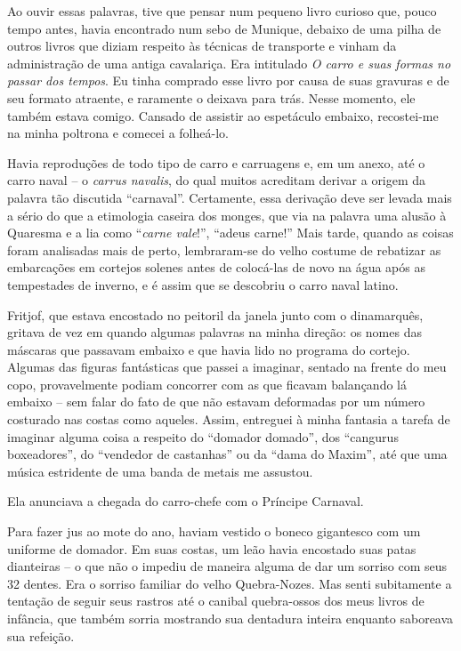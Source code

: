 Ao ouvir essas palavras, tive que pensar num pequeno livro curioso que,
pouco tempo antes, havia encontrado num sebo de Munique, debaixo de uma
pilha de outros livros que diziam respeito às técnicas de transporte e
vinham da administração de uma antiga cavalariça. Era intitulado \emph{O
carro e suas formas no passar dos tempos}. Eu tinha comprado esse livro
por causa de suas gravuras e de seu formato atraente, e raramente o
deixava para trás. Nesse momento, ele também estava comigo. Cansado de
assistir ao espetáculo embaixo, recostei-me na minha poltrona e comecei
a folheá-lo.

Havia reproduções de todo tipo de carro e carruagens e, em um anexo, até
o carro naval -- o \emph{carrus navalis}, do qual muitos acreditam
derivar a origem da palavra tão discutida ``carnaval''. Certamente, essa
derivação deve ser levada mais a sério do que a etimologia caseira dos
monges, que via na palavra uma alusão à Quaresma e a lia como
``\emph{carne vale}!'', ``adeus carne!'' Mais tarde, quando as coisas foram analisadas
mais de perto, lembraram-se do velho costume de rebatizar as
embarcações em cortejos solenes antes de colocá-las de novo na água após
as tempestades de inverno, e é assim que se descobriu o carro naval
latino.

Fritjof, que estava encostado no peitoril da janela junto com o
dinamarquês, gritava de vez em quando algumas palavras na minha direção:
os nomes das máscaras que passavam embaixo e que havia lido no programa
do cortejo. Algumas das figuras fantásticas que passei a imaginar,
sentado na frente do meu copo, provavelmente podiam concorrer com as que
ficavam balançando lá embaixo -- sem falar do fato de que não estavam
deformadas por um número costurado nas costas como aqueles. Assim,
entreguei à minha fantasia a tarefa de imaginar alguma coisa a respeito
do ``domador domado'', dos ``cangurus boxeadores'', do ``vendedor de
castanhas'' ou da ``dama do Maxim'', até que uma música estridente
de uma banda de metais me assustou.

Ela anunciava a chegada do carro-chefe com o Príncipe Carnaval.%

Para fazer jus ao mote do ano, haviam vestido o boneco gigantesco com um
uniforme de domador. Em suas costas, um leão havia encostado suas patas
dianteiras -- o que não o impediu de maneira alguma de dar um sorriso
com seus 32 dentes. Era o sorriso familiar do velho Quebra-Nozes. Mas
senti subitamente a tentação de seguir seus rastros até o canibal
quebra-ossos dos meus livros de infância, que também sorria mostrando
sua dentadura inteira enquanto saboreava sua refeição.

